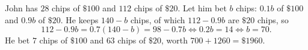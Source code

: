 John has $28$ chips of $\$100$ and $112$ chips of $\$20$. Let him bet $b$ chips: $0.1b$ of $\$100$ and $0.9b$ of $\$20$. He keeps $140-b$ chips, of which $112-0.9b$ are $\$20$ chips, so
\[
112-0.9b=0.7(140-b)=98-0.7b\iff0.2b=14\iff b=70 .
\]
He bet $7$ chips of $\$100$ and $63$ chips of $\$20$, worth $700+1260=\boxed{\$1960}$.

